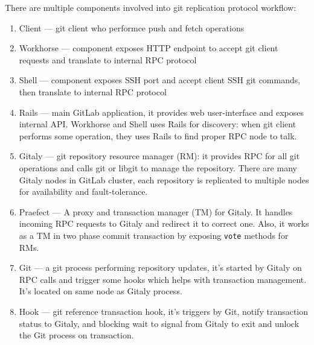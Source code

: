 \documentclass[acmlarge, screen, nonacm]{acmart}
\newcommand{\code}[1]{\texttt{#1}}
\begin{document}
There are multiple components involved into git replication protocol workflow:
\begin{enumerate}
    \item Client --- git client who performce push and fetch operations
    \item Workhorse --- component exposes HTTP endpoint to accept
      git client requests and translate to internal RPC protocol
    \item Shell --- component exposes SSH port and accept client
      SSH git commands, then translate to internal RPC protocol
    \item Rails --- main GitLab application, it provides web user-interface
      and exposes internal API. Workhorse and Shell uses Rails
      for discovery: when git client performs some operation,
      they uses Rails to find proper RPC node to talk.
    \item Gitaly --- git repository resource manager (RM): it provides RPC
      for all git operations and calls git or libgit to manage
      the repository. There are many Gitaly nodes in GitLab cluster,
      each repository is replicated to multiple nodes for availability
      and fault-tolerance.
    \item Praefect --- A proxy and transaction manager (TM) for Gitaly. It handles
      incoming RPC requests to Gitaly and redirect it to correct one.
      Also, it works as a TM in two phase commit transaction by exposing
      \code{vote} methods for RMs.
    \item Git --- a git process performing repository updates, it's started by
      Gitaly on RPC calls and trigger some hooks which helps with transaction
      management. It's located on same node as Gitaly process.
    \item Hook --- git reference transaction hook, it's triggers by Git,
      notify transaction status to Gitaly, and blocking wait to signal from
      Gitaly to exit and unlock the Git process on transaction.
\end{enumerate}
\end{document}

